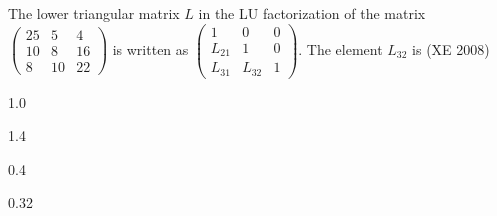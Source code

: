 \item The lower triangular matrix $L$ in the LU factorization of the matrix
$\begin{pmatrix}
    25&5&4\\10&8&16\\8&10&22
\end{pmatrix}$ is written as $\begin{pmatrix}
    1&0&0\\L_{21}&1&0\\L_{31}&L_{32}&1
\end{pmatrix}$. The element $L_{32}$ is 
(XE 2008)
\begin{enumerate}
\begin{multicols}{4}
\item 1.0 
\item 1.4 
\item 0.4 
\item 0.32
\end{multicols}
\end{enumerate}

